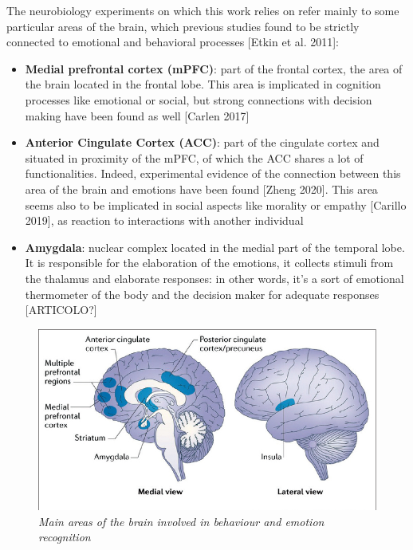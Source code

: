 \documentclass[a4paper]{article}
\begin{document}
	
	The neurobiology experiments on which this work relies on refer mainly to some particular areas of the brain, which previous studies found to be strictly connected to emotional and behavioral processes [Etkin et al. 2011]:
	\begin{itemize}
		
		\item \textbf{Medial prefrontal cortex (mPFC)}:  part of the frontal cortex, the area of the brain located in the frontal lobe. This area is implicated in cognition processes like emotional or social, but strong connections with decision making have been found as well [Carlen 2017]
		
		\item \textbf{Anterior Cingulate Cortex (ACC)}: part of the cingulate cortex and situated in proximity of the mPFC,  of which the ACC shares a lot of functionalities. Indeed, experimental evidence of the connection between this area of the brain and emotions have been found [Zheng 2020]. This area seems also to be implicated in social aspects like morality or empathy [Carillo 2019], as reaction to interactions with another individual
		
		\item \textbf{Amygdala}: nuclear complex located in the medial part of the temporal lobe. It is responsible for the elaboration of the emotions, it collects stimuli from the thalamus and elaborate responses: in other words, it's a sort of emotional thermometer of the body and the decision maker for adequate responses [ARTICOLO?]
	\end{itemize}


	
	\begin{figure}[H]
		\begin{center}
			\includegraphics[scale=.55]{brain.png} 
		\end{center} 
		\caption{\textit{Main areas of the brain involved in behaviour and emotion recognition}}
		
	\end{figure}
\end{document}
